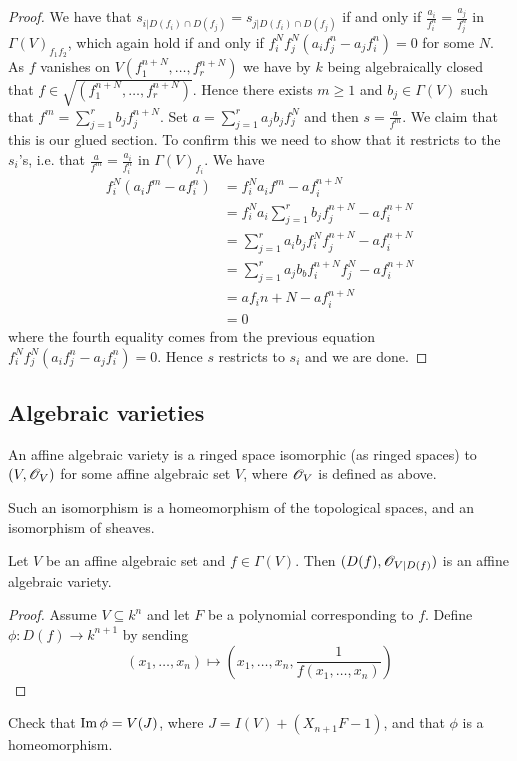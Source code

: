 \begin{proof}
We have that $s_{i\vert D(f_i)\cap D(f_j)}=s_{j\vert D(f_i)\cap D(f_j)}$ if and only if $\frac{a_i}{f_i^n} = \frac{a_j}{f_j^n}$ in $\Gamma(V)_{f_1 f_2}$, which again hold if and only if $f_i^N f_j^N(a_i f_j^n - a_j f_i^n)=0$ for some $N$. As $f$ vanishes on $V(f_1^{n+N}, \ldots, f_r^{n+N})$ we have by $k$ being algebraically closed that $f\in \sqrt{(f_1^{n+N}, \ldots, f_r^{n+N})}$. Hence there exists $m\geq 1$ and $b_j\in \Gamma(V)$ such that $f^m = \sum_{j=1}^r b_j f_j^{n+N}$. Set $a=\sum_{j=1}^r a_j b_j f_j^{N}$ and then $s=\frac{a}{f^m}$. We claim that this is our glued section. To confirm this we need to show that it restricts to the $s_i$'s, i.e. that $\frac{a}{f^m}=\frac{a_i}{f_i^n}$ in $\Gamma(V)_{f_i}$. We have 
\begin{align*}
    f^N_i(a_i f^m - af_i^n) 
    &= f_i^Na_i f^m - af_i^{n+N} \\
    &= f_i^N a_i \sum_{j=1}^r b_j f_j^{n+N} - af_i^{n+N} \\
    &= \sum_{j=1}^r a_i b_j f_i^{N} f_j^{n+N} - af_i^{n+N} \\
    &= \sum_{j=1}^r a_j b_b f_i^{n+N} f_j^{N} - af_i^{n+N} \\
    &= a f_i{n+N} - a f_i^{n+N} \\
    &= 0
\end{align*}
where the fourth equality comes from the previous equation $f_i^N f_j^N(a_i f_j^n - a_j f_i^n)=0$. Hence $s$ restricts to $s_i$ and we are done.

\end{proof}


\subsection{Algebraic varieties}

\begin{definition}
An affine algebraic variety is a ringed space isomorphic (as ringed spaces) to $(V, \mathscr{O}_V)$ for some affine algebraic set $V$, where $\mathscr{O}_V$ is defined as above.
\end{definition}

Such an isomorphism is a homeomorphism of the topological spaces, and an isomorphism of sheaves. 
 
\begin{proposition}
Let $V$ be an affine algebraic set and $f\in \Gamma(V)$. Then $(D(f), \mathscr{O}_{V\vert D(f)})$ is an affine algebraic variety. 
\end{proposition}
\begin{proof}
Assume $V\subseteq k^n$ and let $F$ be a polynomial corresponding to $f$. Define $\phi\colon D(f)\longrightarrow k^{n+1}$ by sending 
\begin{equation*}
    (x_1, \ldots, x_n)\longmapsto (x_1, \ldots , x_n, \frac{1}{f(x_1, \ldots, x_n)})
\end{equation*}
\end{proof}
\begin{problem}
Check that $\operatorname{Im}\phi = V(J)$, where $J=I(V)+(X_{n+1}F - 1)$, and that $\phi$ is a homeomorphism. 
\end{problem}

